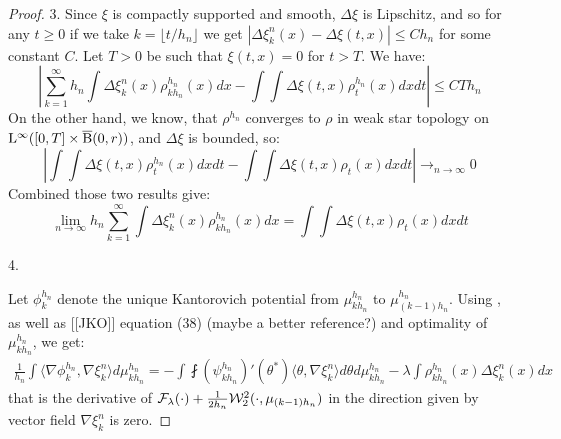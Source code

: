 \begin{proof}
3. Since $\xi$ is compactly supported and smooth, $\Delta \xi$ is Lipschitz, and so for any $ t \geq 0$ if we take $k = \lfloor t/h_n \rfloor$ we get $| \Delta \xi_k^n(x) - \Delta \xi(t,x) | \leq C h_n$ for some constant $C$. Let $T > 0$ be such that $\xi(t,x) = 0 $ for $t > T$. We have:
\[
\left| \sum_{k=1}^{\infty} h_n \int \Delta \xi_k^n(x) \rho_{kh_n}^{h_n}(x) dx - \int \int \Delta \xi(t,x) \rho_{t}^{h_n}(x) dx dt \right| \leq CTh_n 
\]
On the other hand,  we know, that $\rho^{h_n}$ converges to $\rho$ in weak star topology on $\mathrm{L}^{\infty}([0,T] \times \operatorname{\overline{B}}(0,r))$, and $\Delta \xi$ is bounded, so:
\[
\left| \int \int \Delta \xi(t,x) \rho_{t}^{h_n}(x) dx dt - \int \int \Delta \xi (t,x) \rho_t(x) dx dt \right| \rightarrow_{n \rightarrow \infty} 0
\]
Combined those two results give:
\begin{equation} \label{thm:cont_proof_part3}
\lim_{n \rightarrow \infty} h_n \sum_{k=1}^{\infty} \int \Delta \xi_k^n(x) \rho_{kh_n}^{h_n}(x) dx = \int \int \Delta \xi (t,x) \rho_t(x) dx dt
\end{equation}



4. 

Let $\phi_{k}^{h_n}$ denote the unique Kantorovich potential from $\mu_{kh_n}^{h_n}$ to $\mu_{(k-1)h_n}^{h_n}$. Using  \cite[Propositions 1.5.7 and 5.1.7]{bonnotte2013unidimensional}, as well as [[JKO]] equation (38) (maybe a better reference?) and optimality of $\mu_{kh_n}^{h_n}$, we get:
\begin{multline} \label{thm:cont_proof_eq0}
\frac{1}{h_n} \int \langle \nabla \phi_k^{h_n} , \nabla \xi_{k}^n \rangle d\mu_{kh_n}^{h_n} =  - \int \fint (\psi_{kh_n}^{h_n})'(\theta^{*}) \langle \theta, \nabla \xi_k^n \rangle d\theta d\mu_{kh_n}^{h_n} - \lambda \int  \rho_{kh_n}^{h_n}(x) \Delta \xi_k^n(x)  dx 
\end{multline}
that is the derivative of $\mathcal{F}_{\lambda}(\cdot) + \frac{1}{2h_n}{\cal W}_2^2(\cdot, \mu_{(k-1)h_n})$ in the direction given by vector field $\nabla \xi_k^n$ is zero.


\end{proof}
